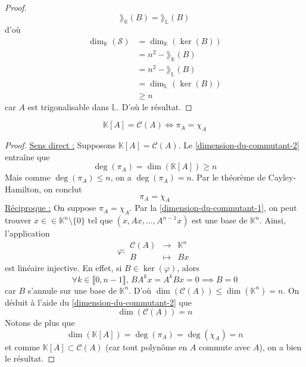 \begin{proof}
		\[ \rang_{\mathbb{K}}(B) = \rang_{\mathbb{L}}(B) \]
		d'où
		\begin{align*}
			\dim_{\mathbb{K}}(\mathcal{S}) &= \dim_{\mathbb{K}}(\ker(B)) \\
			&= n^2 - \rang_{\mathbb{K}}(B) \\
			&= n^2 - \rang_{\mathbb{L}}(B) \\
			&= \dim_{\mathbb{L}}(\ker(B)) \\
			&\geq n
		\end{align*}
		car $A$ est trigonalisable dans $\mathbb{L}$. D'où le résultat.
	\end{proof}

	\begin{theorem}
		\[ \mathbb{K}[A] = \mathcal{C}(A) \iff \pi_A = \chi_A \]
	\end{theorem}

	\begin{proof}
		\uline{Sens direct :} Supposons $\mathbb{K}[A] = \mathcal{C}(A)$. Le \cref{dimension-du-commutant-2} entraîne que
		\[ \deg(\pi_A) = \dim(\mathbb{K}[A]) \geq n \]
		Mais comme $\deg(\pi_A) \leq n$, on a $\deg(\pi_A) = n$. Par le théorème de Cayley-Hamilton, on conclut
		\[ \pi_A = \chi_A \]
		\uline{Réciproque :} On suppose $\pi_A = \chi_A$. Par la \cref{dimension-du-commutant-1}, on peut trouver $x \in \in \mathbb{K}^n \setminus \{ 0 \}$ tel que $(x, Ax, \dots, A^{n-1}x)$ est une base de $\mathbb{K}^n$. Ainsi, l'application
		\[ \varphi :
		\begin{array}{ccc}
			\mathcal{C}(A) &\rightarrow& \mathbb{K}^n \\
			B &\mapsto& Bx
		\end{array}
		\]
		est linéaire injective. En effet, si $B \in \ker(\varphi)$, alors
		\[ \forall k \in \llbracket 0, n-1 \rrbracket, \, BA^kx = A^kBx = 0 \implies B = 0 \]
		car $B$ s'annule sur une base de $\mathbb{K}^n$. D'où $\dim(\mathcal{C}(A)) \leq \dim(\mathbb{K}^n) = n$. On déduit à l'aide du \cref{dimension-du-commutant-2} que
		\[ \dim(\mathcal{C}(A)) = n \]
		Notons de plus que
		\[ \dim(\mathbb{K}[A]) = \deg(\pi_A) = \deg(\chi_A) = n \]
		et comme $\mathbb{K}[A] \subset \mathcal{C}(A)$ (car tout polynôme en $A$ commute avec $A$), on a bien le résultat.
	\end{proof}

